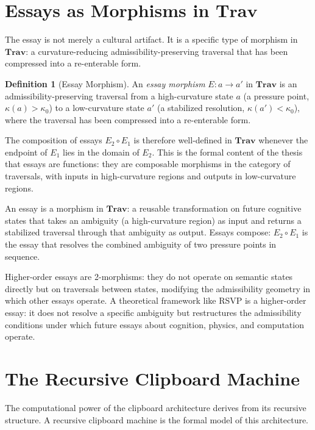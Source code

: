 \documentclass[12pt,oneside]{book}
\newcounter{thesisctr}
\newenvironment{thesis}[1][]{%
  \refstepcounter{thesisctr}%
  \begin{tcolorbox}[
    enhanced,
    breakable,
    colback=cliplight,
    colframe=clipblue,
    fonttitle=\bfseries\small,
    title={Thesis~\thethesisctr\ifx&#1&\else~(#1)\fi},
    left=6pt, right=6pt, top=4pt, bottom=4pt,
    arc=2pt
  ]
}{%
  \end{tcolorbox}
}
\theoremstyle{plain}
\theoremstyle{definition}
\newtheorem{definition}[theorem]{Definition}
\theoremstyle{plain}
\newcommand{\Trav}{\mathbf{Trav}}
\begin{document}
\section{Essays as Morphisms in \texorpdfstring{$\Trav$}{Trav}}

The essay is not merely a cultural artifact. It is a specific type of morphism in $\Trav$: a curvature-reducing admissibility-preserving traversal that has been compressed into a re-enterable form.

\begin{definition}[Essay Morphism]
An \emph{essay morphism} $E : a \to a'$ in $\Trav$ is an admissibility-preserving traversal from a high-curvature state $a$ (a pressure point, $\kappa(a) > \kappa_0$) to a low-curvature state $a'$ (a stabilized resolution, $\kappa(a') < \kappa_0$), where the traversal has been compressed into a re-enterable form.
\end{definition}

The composition of essays $E_2 \circ E_1$ is therefore well-defined in $\Trav$ whenever the endpoint of $E_1$ lies in the domain of $E_2$. This is the formal content of the thesis that essays are functions: they are composable morphisms in the category of traversals, with inputs in high-curvature regions and outputs in low-curvature regions.

\begin{thesis}[Essays as Functions]
An essay is a morphism in $\Trav$: a reusable transformation on future cognitive states that takes an ambiguity (a high-curvature region) as input and returns a stabilized traversal through that ambiguity as output. Essays compose: $E_2 \circ E_1$ is the essay that resolves the combined ambiguity of two pressure points in sequence.
\end{thesis}

Higher-order essays are 2-morphisms: they do not operate on semantic states directly but on traversals between states, modifying the admissibility geometry in which other essays operate. A theoretical framework like RSVP is a higher-order essay: it does not resolve a specific ambiguity but restructures the admissibility conditions under which future essays about cognition, physics, and computation operate.

\section{The Recursive Clipboard Machine}

The computational power of the clipboard architecture derives from its recursive structure. A recursive clipboard machine is the formal model of this architecture.
\end{document}
